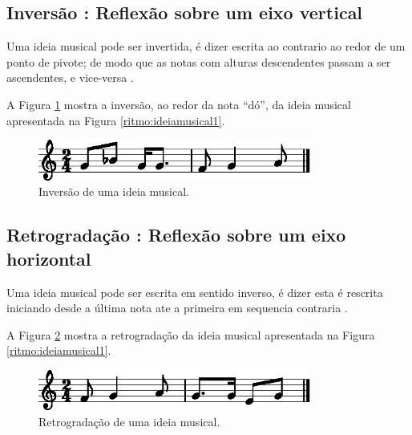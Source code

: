 \subsection{Inversão : Reflexão sobre um eixo vertical}
\label{subsec:inversaovertical}

Uma ideia musical pode ser invertida, é dizer escrita ao contrario ao redor de um ponto de pivote;
de modo que as notas com alturas descendentes passam a ser ascendentes, e vice-versa
\cite[pp. 30]{bennett1993elementos}.

A Figura \ref{ritmo:invert-ex1} mostra a inversão, ao redor da nota ``dó'', 
da ideia musical apresentada na Figura \ref{ritmo:ideiamusical1}.
\begin{figure}[H]
\centering
    \includegraphics[width=0.8\textwidth]{chapters/cap-musica-composer/invert-ex1-1.eps}
\caption{Inversão de uma ideia musical.}
\label{ritmo:invert-ex1}
\end{figure}


\subsection{Retrogradação : Reflexão sobre um eixo horizontal}

Uma ideia musical pode ser escrita em sentido inverso, 
é dizer esta é rescrita iniciando desde a última nota ate a primeira em sequencia contraria 
\cite[pp. 77]{arbones2012armonia}.

A Figura \ref{ritmo:retrogrado-ex1} mostra a retrogradação
da ideia musical apresentada na Figura \ref{ritmo:ideiamusical1}.
\begin{figure}[H]
\vspace{-5px}
\centering
    \includegraphics[width=0.8\textwidth]{chapters/cap-musica-composer/retrogrado-ex1-1.eps}
\vspace{-5px}
\caption{Retrogradação de uma ideia musical.}
\label{ritmo:retrogrado-ex1}
\end{figure}


